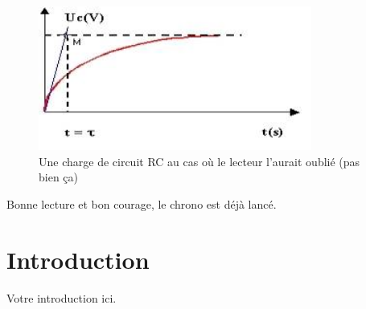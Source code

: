 \documentclass[a4paper,12pt]{article}
\begin{document}
\begin{figure}[H]
	\centering
	\includegraphics[keepaspectratio=true, width=0.8\textwidth]{../images/Charge_RC.jpg}
	\caption{Une charge de circuit RC au cas où le lecteur l'aurait oublié (pas bien ça)}
\end{figure}

\noindent Bonne lecture et bon courage, le chrono est déjà lancé.
\newpage

\tableofcontents %

\newpage

\section{Introduction}
Votre introduction ici.
\end{document}
